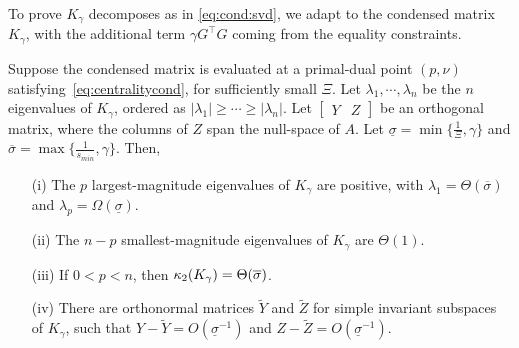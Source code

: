 To prove $K_\gamma$ decomposes as in \eqref{eq:cond:svd},
we adapt \cite[Theorem 3.2]{wright1998ill} to the
condensed matrix $K_\gamma$, with the additional term
$\gamma G^\top G$ coming from the equality constraints.
\begin{theorem}
  \label{thm:cond}
  Suppose the condensed matrix is evaluated at a primal-dual
  point $(p, \nu)$ satisfying~\eqref{eq:centralitycond},
  for sufficiently small $\Xi$.
  Let $\lambda_1, \cdots, \lambda_n$ be the $n$ eigenvalues of
  $K_\gamma$, ordered as $|\lambda_1| \geq  \cdots \geq |\lambda_n|$.
  Let $\begin{bmatrix} Y & Z \end{bmatrix}$ be an orthogonal
  matrix, where the columns of $Z$ span the null-space of
  $A$. Let $\underline{\sigma} =\min\{\frac{1}{\Xi}, \gamma\}$
  and $\overline{\sigma} = \max\{\frac{1}{s_{min}}, \gamma\}$.
  Then,
  \begin{enumerate}
    \item[(i)] The $p$ largest-magnitude eigenvalues of $K_\gamma$ are positive,
      with $\lambda_1 = \Theta(\overline{\sigma})$ and $\lambda_p = \Omega(\underline{\sigma})$.
    \item[(ii)] The $n-p$ smallest-magnitude eigenvalues of $K_\gamma$
      are $\Theta(1)$.
    \item[(iii)] If $0 < p < n$, then $\kappa_2(K_\gamma) = \Theta(\overline{\sigma})$.
    \item[(iv)] There are orthonormal matrices $\widetilde{Y}$ and $\widetilde{Z}$ for
      simple invariant subspaces of $K_\gamma$, such that $Y - \widetilde{Y} = O(\underline{\sigma}^{-1})$
      and $Z - \widetilde{Z} = O(\underline{\sigma}^{-1})$.
  \end{enumerate}
\end{theorem}
